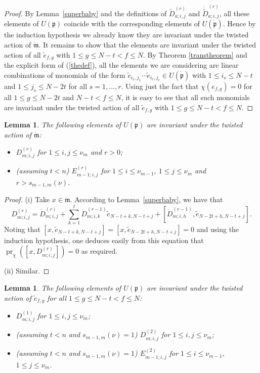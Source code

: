 \documentclass[twoside,12pt,reqno]{amsart}
\newtheorem{Lemma}[Proposition]{Lemma}
\def\pr{{\operatorname{pr}}}
\begin{document}
\begin{proof}
By Lemma~\ref{superbaby} and the definitions of
${\widetilde D}_{a;i,j}^{(r)}$ and $\dot{{\widetilde D}}_{a;i,j}^{(r)}$, 
all these elements of $U(\mathfrak{p})$
coincide with the corresponding elements of $U(\dot{\mathfrak{p}})$.
Hence by the induction hypothesis we already know they are invariant under the
twisted action of $\dot{\mathfrak{m}}$.
It remains to show that the elements are invariant under the twisted action
of all $\tilde e_{f,g}$ with $1 \leq g \leq N-t < f \leq N$.
By Theorem \ref{transtheorem} and the explicit form of (\ref{thedef}),
all the elements we are considering are linear combinations
of monomials of the form
$\tilde e_{i_1,j_1} \cdots \tilde e_{i_r,j_r} \in U(\dot{\mathfrak{p}})$
with $1 \leq i_s \leq N-t$ and $1 \leq j_s \leq N-2t$ for
all $s=1,\dots,r$.
Using just the fact that $\chi(e_{f,g}) = 0$
for all $1 \leq g \leq N-2t$ and $N-t < f \leq N$, it is easy
to see that all such monomials are invariant under the twisted
action of all $\tilde e_{f,g}$ with $1 \leq g \leq N-t<f\leq N$. 
\end{proof}

\begin{Lemma}\label{hor2}
The following elements of $U(\mathfrak{p})$ 
are invariant under the twisted action of
$\dot{\mathfrak{m}}$:
\begin{itemize}
\item[(i)] $D_{m;i,j}^{(r)}$ for $1 \leq i,j \leq \nu_m$
and $r > 0$;
\item[(ii)] (assuming $t < n$) 
$E_{m-1;i,j}^{(r)}$ for $1 \leq i \leq \nu_{m-1}$,
$1 \leq j \leq \nu_m$ and $r > s_{m-1,m}(\nu)$.
\end{itemize}
\end{Lemma}

\begin{proof}
(i) 
Take $x \in \dot{\mathfrak{m}}$.
According to Lemma~\ref{superbaby}, we have that
$$
D_{m;i,j}^{(r)} = \dot D_{m;i,j}^{(r)}
+ \sum_{k=1}^t \dot D_{m;i,k}^{(r-1)} \tilde e_{N-t+k,N-t+j}
+ [\dot D_{m;i,h}^{(r-1)}, \tilde e_{N-2t+h,N-t+j}].
$$
Noting that
$[x,\tilde e_{N-t+k,N-t+j}] =
[x,\tilde e_{N-2t+h,N-t+j}] = 0$ and using the induction
hypothesis, one deduces easily from this equation that
$\pr_\chi([x,  D_{m;i,j}^{(r)}]) = 0$ as required.

(ii) Similar.
\end{proof}

\begin{Lemma}\label{expinvs}
The following elements of $U(\mathfrak{p})$ 
are invariant under the twisted action
of $\tilde e_{f,g}$ 
for all $1 \leq g \leq N-t < f \leq N$:
\begin{itemize}
\item[(i)] $D_{m;i,j}^{(1)}$
for $1 \leq i,j \leq \nu_m$;
\item[(ii)] (assuming $t < n$ and $s_{m-1,m}(\nu)=1$)
$D_{m;i,j}^{(2)}$
for $1 \leq i,j \leq \nu_m$;
\item[(iii)] (assuming $t < n$ and $s_{m-1,m}(\nu)=1$)
$E_{m-1;i,j}^{(2)}$ for $1 \leq i \leq \nu_{m-1}$,
$1 \leq j \leq \nu_m$.
\end{itemize}
\end{Lemma}
\end{document}
